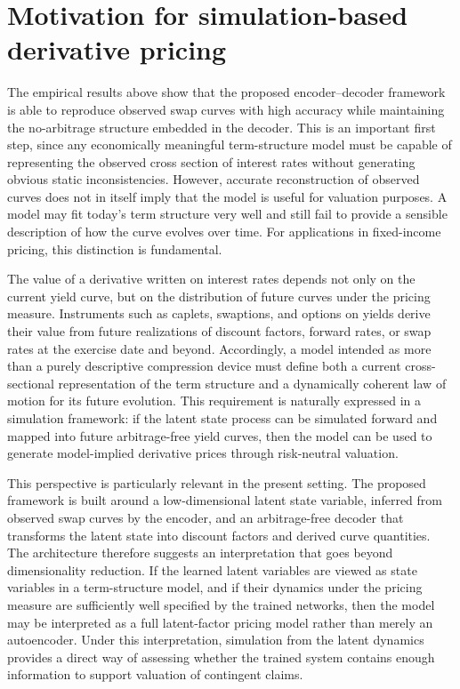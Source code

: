 \section{Motivation for simulation-based derivative pricing}

The empirical results above show that the proposed encoder--decoder framework is able to reproduce observed swap curves with high accuracy while maintaining the no-arbitrage structure embedded in the decoder. 
This is an important first step, since any economically meaningful term-structure model must be capable of representing the observed cross section of interest rates without generating obvious static inconsistencies. 
However, accurate reconstruction of observed curves does not in itself imply that the model is useful for valuation purposes. 
A model may fit today’s term structure very well and still fail to provide a sensible description of how the curve evolves over time. 
For applications in fixed-income pricing, this distinction is fundamental.

The value of a derivative written on interest rates depends not only on the current yield curve, but on the distribution of future curves under the pricing measure. 
Instruments such as caplets, swaptions, and options on yields derive their value from future realizations of discount factors, forward rates, or swap rates at the exercise date and beyond. 
Accordingly, a model intended as more than a purely descriptive compression device must define both a current cross-sectional representation of the term structure and a dynamically coherent law of motion for its future evolution. 
This requirement is naturally expressed in a simulation framework: if the latent state process can be simulated forward and mapped into future arbitrage-free yield curves, then the model can be used to generate model-implied derivative prices through risk-neutral valuation.

This perspective is particularly relevant in the present setting. 
The proposed framework is built around a low-dimensional latent state variable, inferred from observed swap curves by the encoder, and an arbitrage-free decoder that transforms the latent state into discount factors and derived curve quantities. 
The architecture therefore suggests an interpretation that goes beyond dimensionality reduction. 
If the learned latent variables are viewed as state variables in a term-structure model, and if their dynamics under the pricing measure are sufficiently well specified by the trained networks, then the model may be interpreted as a full latent-factor pricing model rather than merely an autoencoder. 
Under this interpretation, simulation from the latent dynamics provides a direct way of assessing whether the trained system contains enough information to support valuation of contingent claims.

